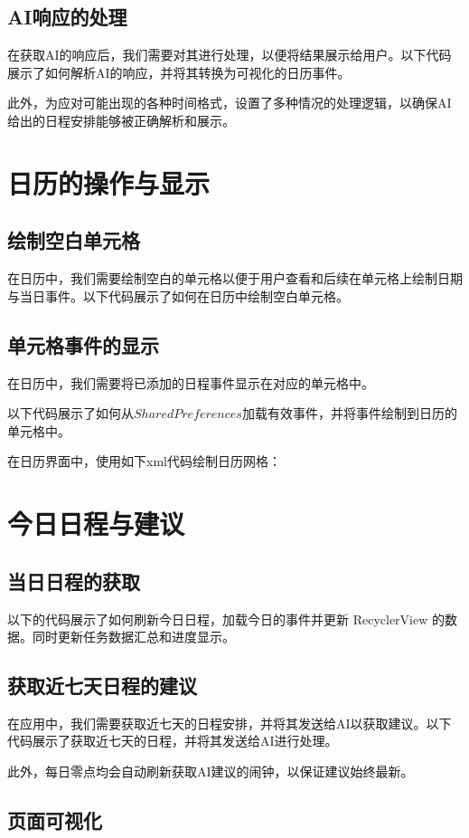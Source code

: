 \documentclass[fontset=windows]{ctexart}
\newcommand{\includecode}[2][]{%
}
\begin{document}
\newpage{}
\subsection{AI响应的处理}
在获取AI的响应后，我们需要对其进行处理，以便将结果展示给用户。以下代码展示了如何解析AI的响应，并将其转换为可视化的日历事件。

此外，为应对可能出现的各种时间格式，设置了多种情况的处理逻辑，以确保AI给出的日程安排能够被正确解析和展示。
\includecode[language=java,caption={日程解析代码}]{src/code2.java}
\newpage{}

\section{日历的操作与显示}
\subsection{绘制空白单元格}
在日历中，我们需要绘制空白的单元格以便于用户查看和后续在单元格上绘制日期与当日事件。以下代码展示了如何在日历中绘制空白单元格。
\includecode[language=java,caption={绘制空白单元格代码}]{src/code3.java}
\newpage{}

\subsection{单元格事件的显示}
在日历中，我们需要将已添加的日程事件显示在对应的单元格中。

以下代码展示了如何从$SharedPreferences$加载有效事件，并将事件绘制到日历的单元格中。
\includecode[language=java,caption={单元格事件显示代码}]{src/code4.java}

在日历界面中，使用如下xml代码绘制日历网格：
\includecode[language=xml,caption={网格绘制}]{src/code5.xml}
\newpage{}

\section{今日日程与建议}
\subsection{当日日程的获取}
以下的代码展示了如何刷新今日日程，加载今日的事件并更新 RecyclerView 的数据。同时更新任务数据汇总和进度显示。
\includecode[language=java,caption={刷新今日日程的代码}]{src/code7.java}
\newpage{}
\subsection{获取近七天日程的建议}
在应用中，我们需要获取近七天的日程安排，并将其发送给AI以获取建议。以下代码展示了获取近七天的日程，并将其发送给AI进行处理。

此外，每日零点均会自动刷新获取AI建议的闹钟，以保证建议始终最新。
\includecode[language=java,caption={获取日程建议的交互代码}]{src/code6.java}
\newpage{}

\subsection{页面可视化}
\includecode[language=xml,caption={绘制今日日程页面}]{src/fragment_today.xml}
\end{document}
